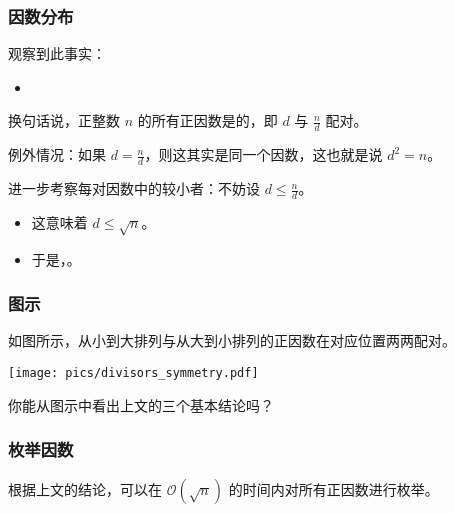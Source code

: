 \begin{frame}
  \frametitle{因数分布}
  观察到此事实：
  \begin{itemize}
    \item {}
  \end{itemize}
  \pause
  换句话说，\alert{正}整数 $n$ 的所有\alert{正}因数是的，即 $d$ 与 $\frac{n}{d}$ 配对。
  \pause
  
  \alert{例外}情况：如果 $d = \frac{n}{d}$，则这其实是同一个因数，这也就是说 \alert{$d^2 = n$}。
  \pause
  \begin{center}
  \end{center}
  \pause
  进一步考察每对因数中的较小者：不妨设 $d \le \frac{n}{d}$。
  \pause
  \begin{itemize}
    \item 这意味着 $d \le \sqrt{n}$。
    \pause
    \item 于是，。
  \end{itemize}
  \pause
  \begin{center}
  \end{center}
\end{frame}
\begin{frame}[c]
  \frametitle{图示}
  如图所示，从小到大排列与从大到小排列的正因数在对应位置两两配对。
  \begin{center}
    \texttt{[image: pics/divisors\_symmetry.pdf]}
  \end{center}
  你能从图示中看出上文的三个基本结论吗？
\end{frame}
\begin{frame}
  \frametitle{枚举因数}
  根据上文的结论，可以在 $\mathcal O (\sqrt{n})$ 的时间内对所有正因数进行枚举。
  
\end{frame}
